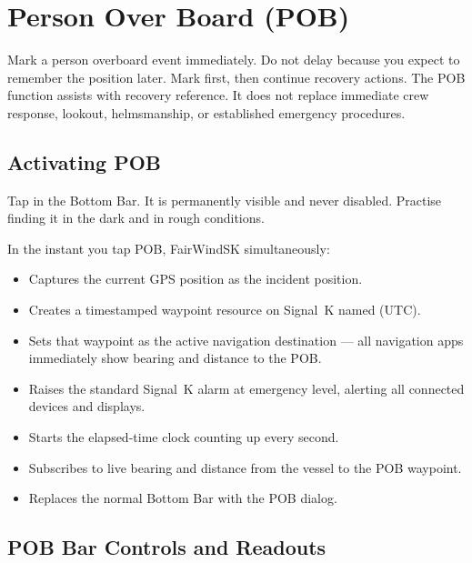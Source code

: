 \chapter{Person Over Board (POB)}
\label{ch:pob}

\begin{warningbox}
Mark a person overboard event immediately.
Do not delay because you expect to remember the position later.
Mark first, then continue recovery actions.
The POB function assists with recovery reference.
It does not replace immediate crew response, lookout, helmsmanship, or established
emergency procedures.
\end{warningbox}

\section{Activating POB}

Tap  in the Bottom Bar.
It is permanently visible and never disabled.
Practise finding it in the dark and in rough conditions.

In the instant you tap POB, FairWindSK simultaneously:

\begin{itemize}
  \item Captures the current GPS position as the incident position.
  \item Creates a timestamped waypoint resource on Signal~K named
         (UTC).
  \item Sets that waypoint as the active navigation destination ---
        all navigation apps immediately show bearing and distance to the POB.
  \item Raises the standard Signal~K  alarm at emergency
        level, alerting all connected devices and displays.
  \item Starts the elapsed-time clock counting up every second.
  \item Subscribes to live bearing and distance from the vessel to the POB waypoint.
  \item Replaces the normal Bottom Bar with the POB dialog.
\end{itemize}


\section{POB Bar Controls and Readouts}

